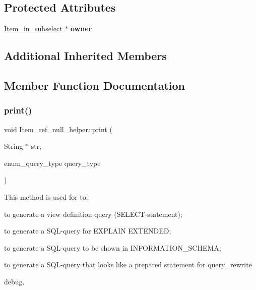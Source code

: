 \subsection*{Protected Attributes}
\begin{DoxyCompactItemize}
\item 
\mbox{\label{classItem__ref__null__helper_a7b0f105467e604ea8dba86597f1cce46}} 
\mbox{\hyperlink{classItem__in__subselect}{Item\+\_\+in\+\_\+subselect}} $\ast$ {\bfseries owner}
\end{DoxyCompactItemize}
\subsection*{Additional Inherited Members}


\subsection{Member Function Documentation}
\mbox{\label{classItem__ref__null__helper_a89293e68530fb3b07572c5005c3220c8}} 
\subsubsection{\texorpdfstring{print()}{print()}}
{\footnotesize\ttfamily void Item\+\_\+ref\+\_\+null\+\_\+helper\+::print (\begin{DoxyParamCaption}\item[{String $\ast$}]{str,  }\item[{enum\+\_\+query\+\_\+type}]{query\+\_\+type }\end{DoxyParamCaption})\hspace{0.3cm}{\ttfamily [virtual]}}

This method is used for to\+:
\begin{DoxyItemize}
\item to generate a view definition query (S\+E\+L\+E\+CT-\/statement);
\item to generate a S\+QL-\/query for E\+X\+P\+L\+A\+IN E\+X\+T\+E\+N\+D\+ED;
\item to generate a S\+QL-\/query to be shown in I\+N\+F\+O\+R\+M\+A\+T\+I\+O\+N\+\_\+\+S\+C\+H\+E\+MA;
\item to generate a S\+QL-\/query that looks like a prepared statement for query\+\_\+rewrite
\item debug.
\end{DoxyItemize}

